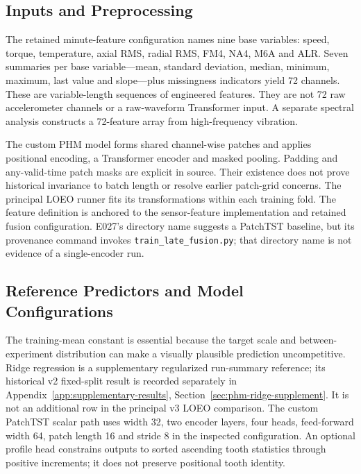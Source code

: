 \subsection{Inputs and Preprocessing}
The retained minute-feature configuration names nine base variables: speed, torque,
temperature, axial RMS, radial RMS, FM4, NA4, M6A and ALR. Seven summaries per base
variable---mean, standard deviation, median, minimum, maximum, last value and
slope---plus missingness indicators yield 72 channels. These are variable-length
sequences of engineered features. They are not 72 raw accelerometer channels or a
raw-waveform Transformer input. A separate spectral analysis constructs a 72-feature
array from high-frequency vibration.

The custom PHM model forms shared channel-wise patches and applies positional encoding,
a Transformer encoder and masked pooling. Padding and any-valid-time patch masks are
explicit in source. Their existence does not prove historical invariance to batch length
or resolve earlier patch-grid concerns. The principal LOEO runner fits its transformations within each training fold.
The feature definition is anchored to the sensor-feature implementation and retained
fusion configuration. E027's directory name suggests a PatchTST baseline, but its
provenance command invokes \texttt{train\_late\_fusion.py}; that directory name is not
evidence of a single-encoder run.
{}
{}

\subsection{Reference Predictors and Model Configurations}
The training-mean constant is essential because the target scale and between-experiment
distribution can make a visually plausible prediction uncompetitive. Ridge regression is a supplementary regularized run-summary reference; its historical
v2 fixed-split result is recorded separately in Appendix~\ref{app:supplementary-results}, Section~\ref{sec:phm-ridge-supplement}.
It is not an additional row in the principal v3 LOEO comparison. The custom PatchTST scalar path uses width 32,
two encoder layers, four heads, feed-forward width 64, patch length 16 and stride 8 in
the inspected configuration. An optional profile head constrains outputs to sorted
ascending tooth statistics through positive increments; it does not preserve positional
tooth identity.

